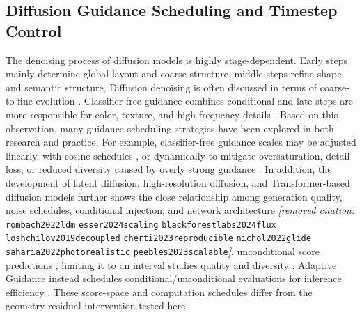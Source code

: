 \documentclass[times,twocolumn,final]{elsarticle}
\providecommand{\DIFadd}[1]{{\protect\color{blue} \sf #1}} %
\providecommand{\DIFdel}[1]{{\protect\color{red} \scriptsize #1}} %
\providecommand{\DIFaddbegin}{} %
\providecommand{\DIFaddend}{} %
\providecommand{\DIFdelbegin}{} %
\providecommand{\DIFdelend}{} %
\begin{document}
\subsection{Diffusion Guidance Scheduling and Timestep Control}
\label{subsec:guidance}

\DIFdelbegin \DIFdel{The denoising process of diffusion models is highly stage-dependent. Early steps mainly determine global layout and coarse structure, middle steps refine shape and semantic structure, }\DIFdelend \DIFaddbegin \DIFadd{Diffusion denoising is often discussed in terms of coarse-to-fine evolution \cite{ho2020ddpm,song2021ddim}. Classifier-free guidance combines conditional }\DIFaddend and \DIFdelbegin \DIFdel{late steps are more responsible for color, texture, and high-frequency details \cite{ho2020ddpm,song2021ddim}. Based on this observation, many guidance scheduling strategies have been explored in both research and practice. For example, classifier-free guidance scales may be adjusted linearly, with cosine schedules , or dynamically to mitigate oversaturation, detail loss, or reduced diversity caused by overly strong guidance \cite{ho2022cfg,castillo2023adaptive}. In addition, the development of latent diffusion, high-resolution diffusion, and Transformer-based diffusion models further shows the close relationship among generation quality, noise schedules, conditional injection, and network architecture \textit{[removed citation: }\texttt{rombach2022ldm} \texttt{esser2024scaling} \texttt{blackforestlabs2024flux} \texttt{loshchilov2019decoupled} \texttt{cherti2023reproducible} \texttt{nichol2022glide} \texttt{saharia2022photorealistic} \texttt{peebles2023scalable}\textit{]}.
}\DIFdelend \DIFaddbegin \DIFadd{unconditional score predictions \cite{ho2022cfg}; limiting it to an interval studies quality and diversity \cite{kynkanniemi2024limited}. Adaptive Guidance instead schedules conditional/unconditional evaluations for inference efficiency \cite{castillo2023adaptive}. These score-space and computation schedules differ from the geometry-residual intervention tested here.
}\DIFaddend
\end{document}
